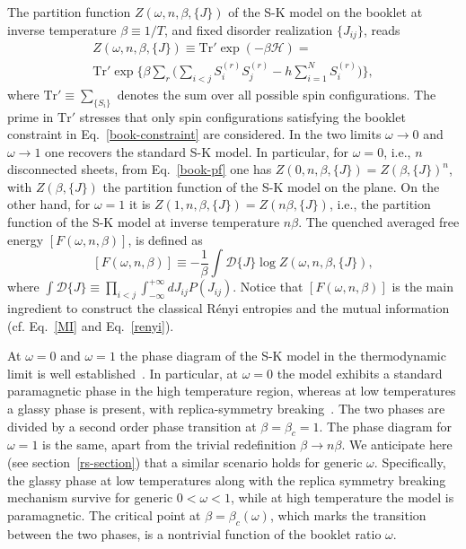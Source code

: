 \documentclass[twocolumn,superscriptaddress,prb,10pt]{revtex4-1}
\begin{document}
The partition function $Z(\omega,n,\beta,\{J\})$ of the S-K model on the booklet 
at inverse temperature $\beta\equiv 1/T$, and fixed disorder realization $\{J_{ij}\}$, 
reads 
%
\begin{multline}
Z(\omega,n,\beta,\{J\})\equiv\textrm{Tr}'\exp(-\beta{\mathcal H})=\\
\textrm{Tr}'\exp\Big\{\beta\sum\limits_{r}\Big(
\sum\limits_{i<j}S^{(r)}_i 
S^{(r)}_j-h\sum\limits_{i=1}^NS^{(r)}_i\Big)\Big\},
\label{book-pf}
\end{multline}
%
where $\textrm{Tr}'\equiv \sum_{\{S_i\}}$ denotes the sum over all possible 
spin configurations. The prime in $\textrm{Tr}'$ stresses that only spin configurations 
satisfying the booklet constraint in Eq.~\eqref{book-constraint} are considered. 
In the two limits $\omega\to 0$ and $\omega\to1$ one recovers the standard 
S-K model. In particular, for $\omega=0$, i.e., $n$ disconnected sheets, from 
Eq.~\eqref{book-pf} one has $Z(0,n,\beta,\{J\})=Z(\beta,\{J\})^n$, with 
$Z(\beta,\{J\})$ the partition function of the S-K model on the plane. 
On the other hand, for $\omega=1$ it is $Z(1,n,\beta,\{J\})=Z(n\beta,\{J\})$, 
i.e., the partition function of the S-K model at inverse temperature $n\beta$. 
The quenched averaged free energy $[F(\omega,n,\beta)]$, is defined as 
%
\begin{equation}
\label{free-energy}
[F(\omega,n,\beta)]\equiv -\frac{1}{\beta}\int {\mathcal D}\{J\}
\log Z(\omega,n,\beta,\{J\}), 
\end{equation}
%
where $\int{\mathcal D}\{J\}\equiv\prod\nolimits_{i<j}\int_{-\infty}^{
+\infty}dJ_{ij}P(J_{ij})$. Notice that $[F(\omega,n,\beta)]$ is the 
main ingredient to construct the classical R\'enyi entropies and the 
mutual information (cf. Eq.~\eqref{MI} and Eq.~\eqref{renyi}).

At $\omega=0$ and $\omega=1$ the phase diagram of the S-K model in the 
thermodynamic limit is well established~\cite{nishimori-book}. In particular, 
at $\omega=0$ the model exhibits a standard paramagnetic phase in the high 
temperature region, whereas at low temperatures a glassy phase is present, 
with replica-symmetry breaking~\cite{nishimori-book}. The two phases are 
divided by a second order phase transition at $\beta=\beta_c=1$. The phase 
diagram for $\omega=1$ is the same, apart from the trivial redefinition
$\beta\to n\beta$. We anticipate here (see section~\ref{rs-section}) that 
a similar scenario holds for generic $\omega$. Specifically, the glassy 
phase at low temperatures along with the replica symmetry breaking mechanism 
survive for generic $0<\omega<1$, while at high temperature the model is 
paramagnetic. The critical point at $\beta=\beta_c(\omega)$, which marks the 
transition between the two phases, is a nontrivial function of the booklet 
ratio $\omega$. 
\end{document}
